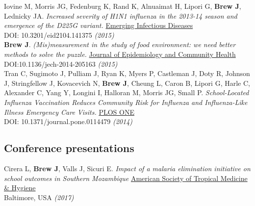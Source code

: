 \documentclass[11pt]{article}
\begin{document}
\noindent Iovine M, Morris JG, Fedenburg K, Rand K, Alnuaimat H, Lipori G, \textbf{Brew J}, Lednicky JA. \emph{Increased severity of H1N1 influenza in the 2013-14 season and emergence of the D225G variant.} \href{http://wwwnc.cdc.gov/eid/article/21/4/14-1375_article}{Emerging Infectious Diseases} \\
DOI: 10.3201/eid2104.141375 \hfill \emph{(2015)}\\


\noindent \textbf{Brew J}. \emph{(Mis)measurement in the study of food environment: we need better methods to solve the puzzle.} \href{http://jech.bmj.com/}{Journal of Epidemiology and Community Health} \\
DOI:10.1136/jech-2014-205163 \hfill \emph{(2015)}\\


\noindent Tran C, Sugimoto J, Pulliam J, Ryan K, Myers P, Castleman J, Doty R, Johnson J, Stringfellow J, Kovacevich N, \textbf{Brew J}, Cheung L, Caron B, Lipori G, Harle C, Alexander C, Yang Y, Longini I, Halloran M, Morris JG, Small P. \emph{School-Located Influenza Vaccination Reduces Community Risk for Influenza and Influenza-Like Illness Emergency Care Visits.} \href{http://journals.plos.org/plosone/article?id=10.1371/journal.pone.0114479}{PLOS ONE} \\
DOI: 10.1371/journal.pone.0114479 \hfill \emph{(2014)}\\

% 


\subsection*{Conference presentations}

\noindent Cirera L, \textbf{Brew J}, Valls J, Sicuri E. \emph{Impact of a malaria elimination initiative on school outcomes in Southern Mozambique} \href{http://www.astmh.org/annual-meeting}{American Society of Tropical Medicine & Hygiene} \\
Baltimore, USA \hfill \emph{(2017)}\\
\end{document}
